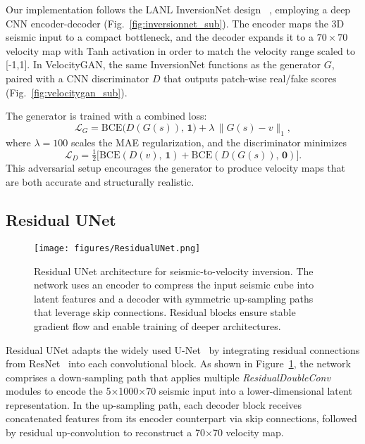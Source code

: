 \documentclass{article}
\begin{document}
  Our implementation follows the LANL InversionNet design ~\cite{inversionnet, velocitygan}, employing a deep CNN encoder-decoder (Fig.~\ref{fig:inversionnet_sub}). The encoder maps the 3D seismic input to a compact bottleneck, and the decoder expands it to a $70\times70$ velocity map with Tanh activation in order to match the velocity range scaled to [-1,1]. In VelocityGAN, the same InversionNet functions as the generator $G$, paired with a CNN discriminator $D$ that outputs patch-wise real/fake scores (Fig.~\ref{fig:velocitygan_sub}).
  
  The generator is trained with a combined loss:
  \[
  \mathcal{L}_G = \mathrm{BCE}\bigl(D(G(s)),\,\mathbf{1}\bigr) + \lambda\,\lVert G(s) - v\rVert_1,
  \]
  where $\lambda = 100$ scales the MAE regularization, and the discriminator minimizes
  \[
  \mathcal{L}_D = \tfrac{1}{2}\bigl[\mathrm{BCE}(D(v),\,\mathbf{1}) + \mathrm{BCE}(D(G(s)),\,\mathbf{0})\bigr].
  \]
  This adversarial setup encourages the generator to produce velocity maps that are both accurate and structurally realistic.  



\subsection{Residual UNet}

\begin{figure}
    \centering
    \texttt{[image: figures/ResidualUNet.png]}
    \caption{Residual UNet architecture for seismic-to-velocity inversion. The network uses an encoder to compress the input seismic cube into latent features and a decoder with symmetric up-sampling paths that leverage skip connections. Residual blocks ensure stable gradient flow and enable training of deeper architectures.}
    \label{fig:residual_unet}
\end{figure}

Residual UNet adapts the widely used U-Net~\cite{ronneberger2015u} by integrating residual connections from ResNet~\cite{he2016deep} into each convolutional block. As shown in Figure~\ref{fig:residual_unet}, the network comprises a down-sampling path that applies multiple \emph{ResidualDoubleConv} modules to encode the 5×1000×70 seismic input into a lower-dimensional latent representation. In the up-sampling path, each decoder block receives concatenated features from its encoder counterpart via skip connections, followed by residual up-convolution to reconstruct a 70×70 velocity map.
\end{document}
